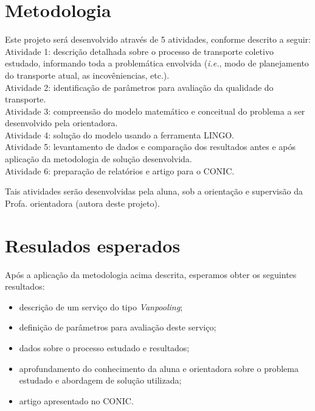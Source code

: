 \documentclass[11pt,a4paper]{article}
\begin{document}
\section{Metodologia}

Este projeto será desenvolvido através de 5 atividades, conforme descrito a seguir:\\

Atividade 1: descrição detalhada sobre o processo de transporte coletivo estudado, informando toda a problemática envolvida (\emph{i.e.}, modo de planejamento do transporte atual, as incovêniencias, etc.).\\

Atividade 2: identificação de parâmetros para avaliação da qualidade do transporte.\\

Atividade 3: compreensão do modelo matemático e conceitual do problema a ser desenvolvido pela orientadora.\\

Atividade 4: solução do modelo usando a ferramenta LINGO.\\

Atividade 5: levantamento de dados e comparação dos resultados antes e após aplicação da metodologia de solução desenvolvida.\\

Atividade 6: preparação de relatórios e artigo para o CONIC.

Tais atividades serão desenvolvidas pela aluna, sob a orientação e supervisão da Profa. orientadora (autora deste projeto).

\section{Resulados esperados}

Após a aplicação da metodologia acima descrita, esperamos obter os seguintes resultados: 

\begin{itemize}
    \item descrição de um serviço do tipo \emph{Vanpooling};
    \item definição de parâmetros para avaliação deste serviço;
    \item dados sobre o processo estudado e resultados;
    \item aprofundamento do conhecimento da aluna e orientadora sobre o problema estudado e abordagem de solução utilizada;
    \item artigo apresentado no CONIC.
\end{itemize}
\end{document}
